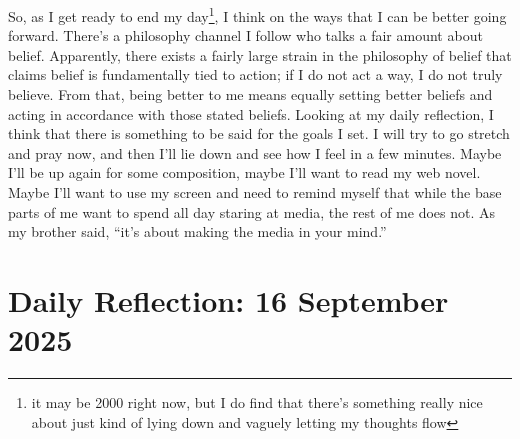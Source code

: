 \documentclass[12pt]{article}
\newcommand{\say}[1]{``#1''}
\renewcommand{\,}{\textsuperscript{,}}
\begin{document}
So, as I get ready to end my day\footnote{it may be 2000 right now, but I do find that there's something really nice about just kind of lying down and vaguely letting my thoughts flow}, I think on the ways that I can be better going forward.
There's a philosophy channel I follow who talks a fair amount about belief.
Apparently, there exists a fairly large strain in the philosophy of belief that claims belief is fundamentally tied to action; if I do not act a way, I do not truly believe.
From that, being better to me means equally setting better beliefs and acting in accordance with those stated beliefs.
Looking at my daily reflection, I think that there is something to be said for the goals I set.
I will try to go stretch and pray now, and then I'll lie down and see how I feel in a few minutes.
Maybe I'll be up again for some composition, maybe I'll want to read my web novel.
Maybe I'll want to use my screen and need to remind myself that while the base parts of me want to spend all day staring at media, the rest of me does not.
As my brother said, \say{it's about making the media in your mind.}


\section{Daily Reflection: 16 September 2025}
\end{document}
